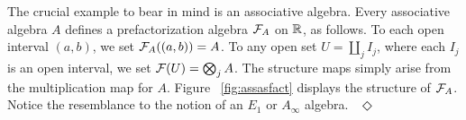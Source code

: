 \documentclass[11pt]{amsart}
\begin{document}
\begin{eg}\label{ex:associativealgebra}
The crucial example to bear in mind is an associative algebra. Every associative algebra $A$ defines a prefactorization algebra $\mathcal F_A$ on $\mathbb R$, as follows. To each open interval $(a,b)$, we set $\mathcal F_A( (a,b) ) = A$. To any open set $U = \coprod_j I_j$, where each $I_j$ is an open interval, we set $\mathcal F(U) = \bigotimes_j A$. The structure maps simply arise from the multiplication map for $A$. Figure ~\ref{fig:assasfact} displays the structure of $\mathcal F_A$. Notice the resemblance to the notion of an $E_1$ or $A_\infty$ algebra. 
~\hfill$\Diamond$
\end{eg}

\end{document}
